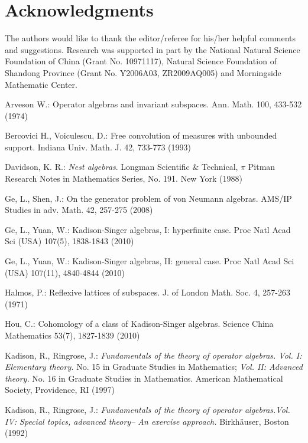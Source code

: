 \documentclass[12pt]{article}
\begin{document}
{\section*{\bf Acknowledgments}\quad  The authors would like to thank the editor/referee for his/her helpful comments and
suggestions. Research was supported in part by the National Natural
Science Foundation of China (Grant No. 10971117), Natural Science
Foundation of Shandong Province (Grant No. Y2006A03, ZR2009AQ005)
and Morningside Mathematic Center.




\begin{thebibliography}{00}


 Arveson W.: Operator algebras and invariant subspaces. Ann. Math. 100, 433-532 (1974)

 Bercovici H., Voiculescu, D.: Free convolution of measures with unbounded
support. Indiana Univ. Math. J. 42, 733-773 (1993)

 Davidson, K. R.:
{\sl Nest algebras}. Longman Scientific \& Technical, {\bf $\pi$}
Pitman Research Notes in Mathematics Series, {No. 191}. New York
(1988)

 Ge, L., Shen, J.: On the generator problem of von Neumann algebras. AMS/IP Studies in adv. Math. 42, 257-275 (2008)

 Ge, L., Yuan, W.: Kadison-Singer algebras,
I: hyperfinite case. Proc Natl Acad Sci (USA) 107(5), 1838-1843
(2010)

 Ge, L., Yuan, W.: Kadison-Singer algebras,
II: general case. Proc Natl Acad Sci (USA) 107(11), 4840-4844 (2010)

 Halmos, P.: Reflexive lattices of subspaces. J. of London Math. Soc. 4,
257-263 (1971)

 Hou, C.: Cohomology of a class of Kadison-Singer algebras. Science China Mathematics
53(7), 1827-1839 (2010)

 Kadison, R., Ringrose, J.: {\sl Fundamentals of the theory
of operator algebras. Vol. I: Elementary theory.} No. 15 in Graduate
Studies in Mathematics; {\sl Vol. II: Advanced theory.} No. 16 in
Graduate Studies in Mathematics. American Mathematical Society,
Providence, RI (1997)


 Kadison, R., Ringrose, J.: {\sl Fundamentals of the theory
of operator algebras.Vol. IV: Special topics, advanced theory-- An
exercise approach.}  Birkh\"{a}user, Boston (1992)


\end{thebibliography}}
\end{document}
